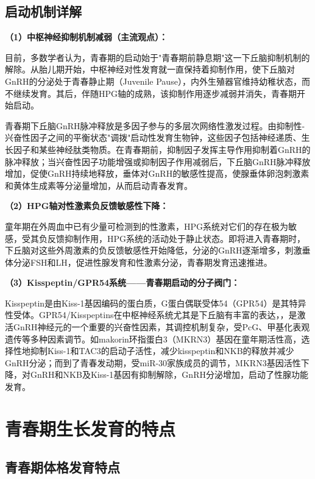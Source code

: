 \subsection{启动机制详解}

\begin{keybox}
\textbf{（1）中枢神经抑制机制减弱（主流观点）：}

目前，多数学者认为，青春期的启动始于"青春期前静息期"这一下丘脑抑制机制的解除。从胎儿期开始，中枢神经对性发育就一直保持着抑制作用，使下丘脑对GnRH的分泌处于青春静止期（Juvenile Pause），内外生殖器官维持幼稚状态，而不继续发育。其后，伴随HPG轴的成熟，该抑制作用逐步减弱并消失，青春期开始启动。

青春期下丘脑GnRH脉冲释放是多因子参与的多层次网络性激发过程。由抑制性-兴奋性因子之间的平衡状态"调拨"启动性发育生物钟，这些因子包括神经递质、生长因子和某些神经肽类物质。在青春期前，抑制因子发挥主导作用抑制着GnRH的脉冲释放；当兴奋性因子功能增强或抑制因子作用减弱后，下丘脑GnRH脉冲释放增加，促使GnRH持续地释放，垂体对GnRH的敏感性提高，使腺垂体卵泡刺激素和黄体生成素等分泌量增加，从而启动青春发育。

\textbf{（2）HPG轴对性激素负反馈敏感性下降：}

童年期在外周血中已有少量可检测到的性激素，HPG系统对它们的存在极为敏感，受其负反馈抑制作用，HPG系统的活动处于静止状态。即将进入青春期时，下丘脑对这些外周激素的负反馈敏感性开始降低，分泌的GnRH逐渐增多，刺激垂体分泌FSH和LH，促进性腺发育和性激素分泌，青春期发育迅速推进。

\textbf{（3）Kisspeptin/GPR54系统——青春期启动的分子阀门：}

Kisspeptin是由Kiss-1基因编码的蛋白质，G蛋白偶联受体54（GPR54）是其特异性受体。GPR54/Kisspeptins在中枢神经系统尤其是下丘脑有丰富的表达，，是激活GnRH神经元的一个重要的兴奋性因素，其调控机制复杂，受PcG、甲基化表观遗传等多种因素调节。如makorin环指蛋白3（MKRN3）基因在童年期活性高，选择性地抑制Kiss-1和TAC3的启动子活性，减少kisspeptin和NKB的释放并减少GnRH分泌；而到了青春发动期，受miR-30家族成员的调节，MKRN3基因活性下降，对GnRH和NKB及Kiss-1基因有抑制解除，GnRH分泌增加，启动了性腺功能发育。
\end{keybox}

\section{青春期生长发育的特点}

\subsection{青春期体格发育特点}

